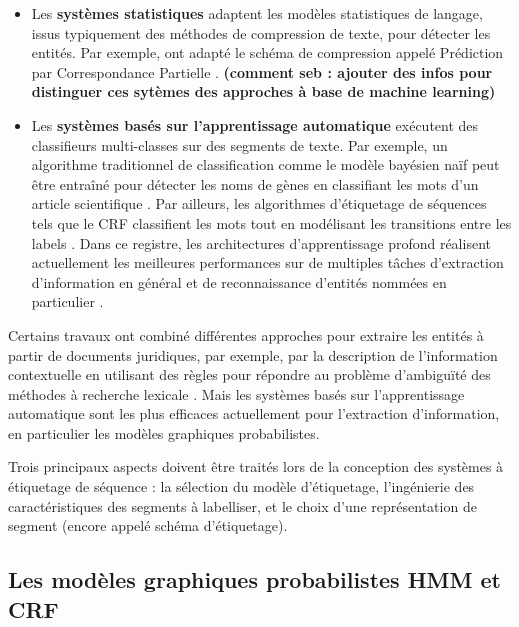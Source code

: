 \begin{itemize}
\item Les \textbf{systèmes statistiques} adaptent les modèles statistiques de langage, issus typiquement des méthodes de compression de texte, pour détecter les entités. Par exemple, \citet{witten1999languagemodel} ont adapté le schéma de compression appelé \og Prédiction par Correspondance Partielle \fg{}. \textbf{(comment seb : ajouter des infos pour distinguer ces sytèmes des approches à base de machine learning)}

\item Les \textbf{systèmes basés sur l'apprentissage automatique} exécutent des classifieurs multi-classes sur des segments de texte. Par exemple, un algorithme traditionnel de classification comme le modèle bayésien naïf peut être entraîné pour détecter les noms de gènes en classifiant les mots d'un article scientifique \citep{persson2012nbbioner}. Par ailleurs, les algorithmes d'étiquetage de séquences tels que le CRF classifient les mots tout en modélisant les transitions entre les labels \citep{finkel2005stanfordcrfner}. Dans ce registre, les architectures d'apprentissage profond réalisent actuellement les meilleures performances sur de multiples tâches d'extraction d'information en général et de reconnaissance d'entités nommées en particulier \citep{lample2016nnner}.
\end{itemize}
Certains travaux ont combiné différentes approches pour extraire les entités à partir de documents juridiques,  par exemple,  par la description de l'information contextuelle en utilisant des règles pour répondre au problème d'ambiguïté des méthodes à recherche lexicale \citep{mikheev1999NERlexicalWithRules,hanisch2005prominer}. Mais les systèmes basés sur l'apprentissage automatique sont les plus efficaces actuellement pour l'extraction d'information, en particulier les modèles graphiques probabilistes.

Trois principaux aspects doivent être traités lors de la conception des systèmes à étiquetage de séquence : la sélection du modèle d'étiquetage, l'ingénierie des caractéristiques des segments à labelliser, et le choix d'une représentation de segment (encore appelé schéma d'étiquetage). 

\subsection{Les modèles graphiques probabilistes HMM et CRF}

